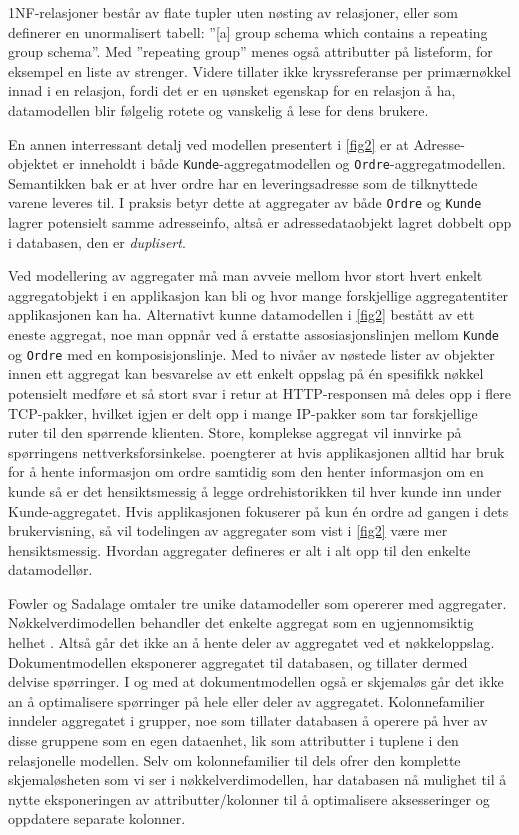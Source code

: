 1NF-relasjoner består av flate tupler uten nøsting av relasjoner, eller som \cite{codd1971} definerer en unormalisert tabell: ''[a] group schema which contains a repeating group schema''. Med ''repeating group'' menes også attributter på listeform, for eksempel en liste av strenger. Videre tillater ikke \cite{codd1971} kryssreferanse per primærnøkkel innad i en relasjon, fordi det er en uønsket egenskap for en relasjon å ha, datamodellen blir følgelig rotete og vanskelig å lese for dens brukere.

En annen interressant detalj ved modellen presentert i \ref{fig2} er at Adresse-objektet er inneholdt i både \texttt{Kunde}-aggregatmodellen og \texttt{Ordre}-aggregatmodellen. Semantikken bak er at hver ordre har en leveringsadresse som de tilknyttede varene leveres til. I praksis betyr dette at aggregater av både \texttt{Ordre} og \texttt{Kunde} lagrer potensielt samme adresseinfo, altså er adressedataobjekt lagret dobbelt opp i databasen, den er \emph{duplisert}.

Ved modellering av aggregater må man avveie mellom hvor stort hvert enkelt aggregatobjekt i en applikasjon kan bli og hvor mange forskjellige aggregatentiter applikasjonen kan ha. Alternativt kunne datamodellen i \ref{fig2} bestått av ett eneste aggregat, noe man oppnår ved å erstatte assosiasjonslinjen mellom \texttt{Kunde} og \texttt{Ordre} med en komposisjonslinje. Med to nivåer av nøstede lister av objekter innen ett aggregat kan besvarelse av ett enkelt oppslag på én spesifikk nøkkel potensielt medføre et så stort svar i retur at HTTP-responsen må deles opp i flere TCP-pakker, hvilket igjen er delt opp i mange IP-pakker som tar forskjellige ruter til den spørrende klienten. Store, komplekse aggregat vil innvirke på spørringens nettverksforsinkelse. \cite{sadalage2013} poengterer at hvis applikasjonen alltid har bruk for å hente informasjon om ordre samtidig som den henter informasjon om en kunde så er det hensiktsmessig å legge ordrehistorikken til hver kunde inn under Kunde-aggregatet. Hvis applikasjonen fokuserer på kun én ordre ad gangen i dets brukervisning, så vil todelingen av aggregater som vist i \ref{fig2} være mer hensiktsmessig. Hvordan aggregater defineres er alt i alt opp til den enkelte datamodellør.

Fowler og Sadalage omtaler tre unike datamodeller som opererer med aggregater. Nøkkelverdimodellen behandler det enkelte aggregat som en ugjennomsiktig helhet \citep{sadalage2013}. Altså går det ikke an å hente deler av aggregatet ved et nøkkeloppslag. Dokumentmodellen eksponerer aggregatet til databasen, og tillater dermed delvise spørringer. I og med at dokumentmodellen også er skjemaløs går det ikke an å optimalisere spørringer på hele eller deler av aggregatet. Kolonnefamilier inndeler aggregatet i grupper, noe som tillater databasen å operere på hver av disse gruppene som en egen dataenhet, lik som attributter i tuplene i den relasjonelle modellen. Selv om kolonnefamilier til dels ofrer den komplette skjemaløsheten som vi ser i nøkkelverdimodellen, har databasen nå mulighet til å nytte eksponeringen av attributter/kolonner til å optimalisere aksesseringer og oppdatere separate kolonner.

